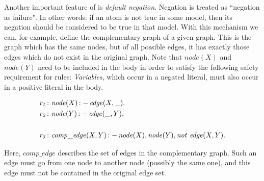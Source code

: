 \documentclass[a4paper, titlepage]{article}
\DeclareMathOperator{\leftimpl}{:-}
\newcommand{\row}[1]{%
  \ensuremath{\it \color{black} #1 \color{black}}%
}
\begin{document}
Another important feature of \dlvhex{} is \emph{default 
negation}. Negation is treated as ``negation as failure". 
In other words: if an atom is not true in some model, then 
its negation should be considered to be true in that model. 
With this mechanism we can, for example, define the 
complementary graph of a given graph. This is the graph 
which has the same nodes, but of all possible edges, it has 
exactly those edges which do not exist in the original 
graph. Note that $\mathit{node}(X)$ and $\mathit{node}(Y)$ 
need to be included in the body in order to satisfy the 
following safety requirement for rules: \emph{Variables}, 
which occur in a negated literal, must also occur in a 
positive literal in the body.
\begin{exmp}
\begin{align*}
\row{r_1}\colon& \mathit{node}(X) \leftimpl \mathit{edge}(X, \_).
\\
\row{r_2}\colon& \mathit{node}(Y) \leftimpl \mathit{edge}(\_, Y). 
\\ \\
\row{r_3}\colon& \mathit{comp\_edge}(X, Y) \leftimpl 
\mathit{node}(X), \mathit{node}(Y), \mathit{ not } \ \mathit{ 
edge }(X, Y). 
\end{align*}
\end{exmp}
Here, $\mathit{comp\_edge}$ describes the set of edges in 
the complementary graph. Such an edge must go from one node 
to another node (possibly the same one), and this edge must 
not be contained in the original edge set. 
\end{document}

